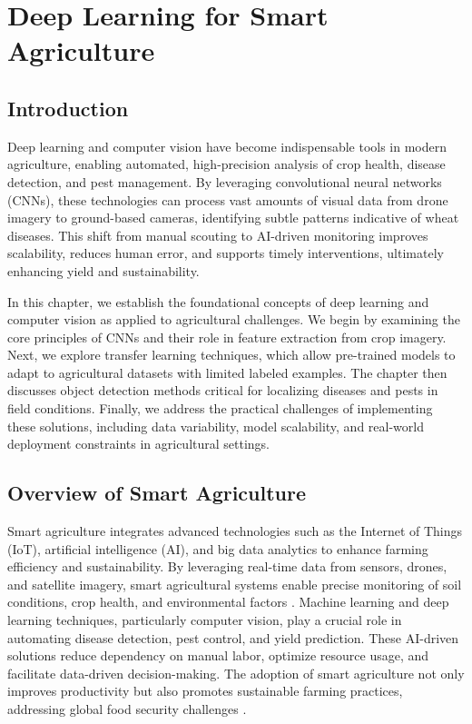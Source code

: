 \chapter{Deep Learning for Smart Agriculture}

\section{Introduction}
Deep learning and computer vision have become indispensable tools in modern agriculture, enabling automated, high-precision analysis of crop health, disease detection, and pest management. By leveraging convolutional neural networks (CNNs), these technologies can process vast amounts of visual data from drone imagery to ground-based cameras, identifying subtle patterns indicative of wheat diseases. This shift from manual scouting to AI-driven monitoring improves scalability, reduces human error, and supports timely interventions, ultimately enhancing yield and sustainability.

In this chapter, we establish the foundational concepts of deep learning and computer vision as applied to agricultural challenges. We begin by examining the core principles of CNNs and their role in feature extraction from crop imagery. Next, we explore transfer learning techniques, which allow pre-trained models to adapt to agricultural datasets with limited labeled examples. The chapter then discusses object detection methods critical for localizing diseases and pests in field conditions. Finally, we address the practical challenges of implementing these solutions, including data variability, model scalability, and real-world deployment constraints in agricultural settings.

\section{Overview of Smart Agriculture}
Smart agriculture integrates advanced technologies such as the Internet of Things (IoT), artificial intelligence (AI), and big data analytics to enhance farming efficiency and sustainability. By leveraging real-time data from sensors, drones, and satellite imagery, smart agricultural systems enable precise monitoring of soil conditions, crop health, and environmental factors \parencite{garg2023smart}.
Machine learning and deep learning techniques, particularly computer vision, play a crucial role in automating disease detection, pest control, and yield prediction. These AI-driven solutions reduce dependency on manual labor, optimize resource usage, and facilitate data-driven decision-making. The adoption of smart agriculture not only improves productivity but also promotes sustainable farming practices, addressing global food security challenges \parencite{garg2023smart}.

